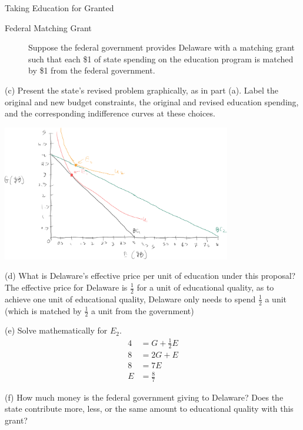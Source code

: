 \documentclass[8pt]{extarticle}
\begin{document}
\begin{problem}{Taking Education for Granted}
    \begin{description}
      \item[Federal Matching Grant] Suppose the federal government provides Delaware with a matching grant such that each \$1 of state spending on the education program is matched by \$1 from the federal government.
    \end{description}
    \begin{problem}{(c)}
      Present the state's revised problem graphically, as in part (a). Label the original and new budget constraints, the original and revised education spending, and the corresponding indifference curves at these choices.
      \tcblower
      \begin{center}
        \includegraphics[width=0.75\textwidth]{images/3_4_c.png}
      \end{center}
    \end{problem}
    \begin{problem}{(d)}
      What is Delaware's effective price per unit of education under this proposal?
      \tcblower
      The effective price for Delaware is $\frac{1}{2}$ for a unit of educational quality, as to achieve one unit of educational quality, Delaware only needs to spend $\frac{1}{2}$ a unit (which is matched by $\frac{1}{2}$ a unit from the government)
    \end{problem}
    \begin{problem}{(e)}
      Solve mathematically for $E_2$.
      \tcblower
      \begin{align*}
        4 &= G +  \frac{1}{2}E \\
        8 &= 2G + E \\
        8 &= 7E \tag*{substitute $G = 3E$}\\
        E &= \frac{8}{7}
      \end{align*}
    \end{problem}
    \begin{problem}{(f)}
      How much money is the federal government giving to Delaware? Does the state contribute more, less, or the same amount to educational quality with this grant?

\end{problem}
\end{problem}
\end{document}

